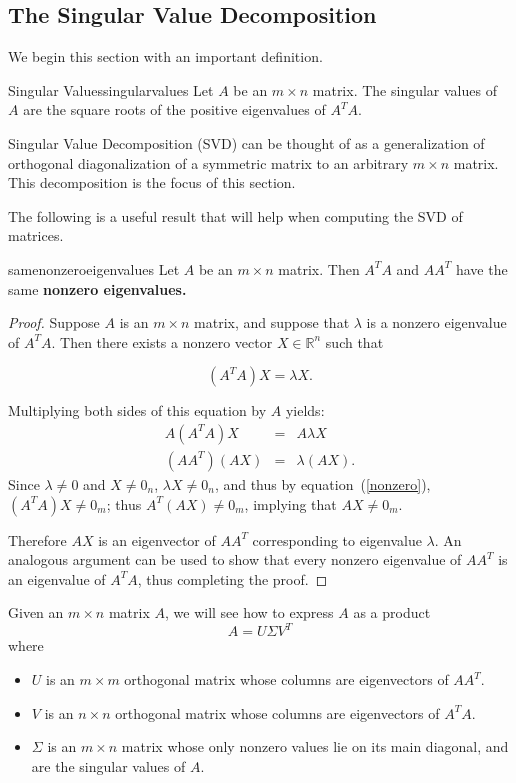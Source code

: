 \subsection{The Singular Value Decomposition}

We begin this section with an important definition.

\begin{definition}{Singular Values}{singularvalues}
Let $A$ be an $m\times n$ matrix. The singular values of $A$ are the square roots of the positive
eigenvalues of $A^TA$.
\end{definition}

Singular Value Decomposition (SVD) can be thought of as 
a generalization of orthogonal diagonalization of a symmetric matrix
to an arbitrary $m\times n$ matrix. This decomposition is the focus of this section. 

The following is a useful result that will help when computing the SVD of matrices.

\begin{proposition}{}{samenonzeroeigenvalues}
Let $A$ be an $m \times n$ matrix. Then $A^TA$ and $AA^T$ have the same \bf{nonzero} eigenvalues.
\end{proposition}

\begin{proof}
Suppose $A$ is an $m\times n$ matrix, and suppose that  $\lambda$ is a nonzero eigenvalue of $A^TA$.
Then there exists a nonzero vector $X\in \mathbb{R}^n$ such that

\begin{equation}\label{nonzero}
(A^TA)X=\lambda X.
\end{equation}

Multiplying both sides of this equation by $A$ yields:
\begin{eqnarray*}
A(A^TA)X & = & A\lambda X\\
(AA^T)(AX) & = & \lambda (AX).
\end{eqnarray*}
Since $\lambda\neq 0$ and $X\neq 0_n$, $\lambda X\neq 0_n$,
and thus by equation~(\ref{nonzero}),
$(A^TA)X\neq 0_m$; thus $A^T(AX)\neq 0_m$, 
implying that $AX\neq 0_m$.

Therefore $AX$ is an eigenvector of $AA^T$ corresponding to eigenvalue
$\lambda$.  An analogous argument can be used to show that every
nonzero eigenvalue of $AA^T$ is an eigenvalue of $A^TA$, thus
completing the proof.
\end{proof}

Given an $m\times n$ matrix $A$, we will see how to express $A$ as a product
\[ A=U\Sigma V^T\]
where
\begin{itemize}
\item $U$ is an $m\times m$ orthogonal matrix whose columns are
eigenvectors of $AA^T$.
\item $V$ is an $n\times n$ orthogonal matrix whose columns are
eigenvectors of $A^TA$.
\item $\Sigma$ is an $m\times n$ matrix whose only nonzero values
lie on its main diagonal, and are the singular values of $A$.
\end{itemize}

